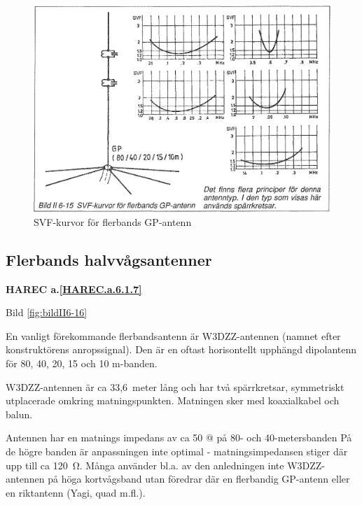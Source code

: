 \begin{figure}
  \includegraphics[width=\textwidth]{images/bild_2_6-15}
  \caption{SVF-kurvor för flerbands GP-antenn}
  \label{fig:bildII6-15}
\end{figure}

\subsection{Flerbands halvvågsantenner}
\textbf{
HAREC a.\ref{HAREC.a.6.1.7}\label{myHAREC.a.6.1.7}
}

Bild \ref{fig:bildII6-16}
\label{W3DZZ}

En vanligt förekommande flerbandsantenn är W3DZZ-antennen (namnet
efter konstruktörens anropssignal). Den är en oftast horisontellt
upphängd dipolantenn för 80, 40, 20, 15 och 10 m-banden.

W3DZZ-antennen är ca 33,6~meter lång och har två spärrkretsar,
symmetriskt utplacerade omkring matningspunkten. Matningen sker med
koaxialkabel och balun.

Antennen har en matnings impedans av ca 50 @ på 80- och
40-metersbanden På de högre banden är anpassningen inte optimal -
matningsimpedansen stiger där upp till ca 120~Ω. Många använder
bl.a. av den anledningen inte W3DZZ-antennen på höga kortvågsband utan
föredrar där en flerbandig GP-antenn eller en riktantenn (Yagi, quad
m.fl.).


